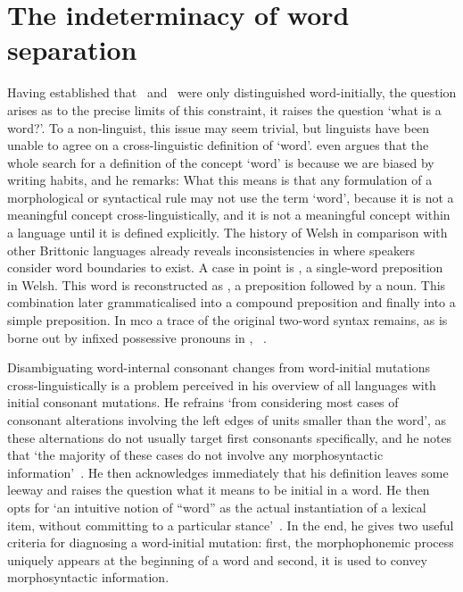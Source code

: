 \section{The indeterminacy of word separation}
\label{sec:indet-word-separ}
Having established that \lT\ and \xD\ were only distinguished word-initially, the question arises as to the precise limits of this constraint, \ie it raises the question `what is a word?'.
To a non-linguist, this issue may seem trivial, but linguists have been unable to agree on a cross-linguistic definition of `word'.
\Textcite[28]{haspelmath_indeterminacy_2011} even argues that the whole search for a definition of the concept `word' is because we are biased by writing habits, and he remarks: 
What this means is that any formulation of a morphological or syntactical rule may not use the term `word', because it is not a meaningful concept cross-linguistically, and it is not a meaningful concept within a language until it is defined explicitly. 
The history of Welsh in comparison with other Brittonic languages already reveals inconsistencies in where speakers consider word boundaries  to exist.
A case in point is , a single-word preposition in Welsh.
This word is reconstructed as  \autocite[258]{schrijver_studies_1995}, a preposition followed by a noun.
This combination later grammaticalised into a compound preposition and finally into a simple preposition.
In \gls{mco} a trace of the original two-word syntax remains, as is borne out by infixed possessive pronouns in , \etc~\autocite[120]{koch_neo-brittonic_1989}.

Disambiguating word-internal consonant changes from word-initial mutations cross-linguistically is  a problem \textcite{iosad_right_2010} perceived in his overview of all languages with initial consonant mutations.
He refrains `from considering most cases of consonant alterations involving the left edges of units smaller than the word', as these alternations do not usually target first consonants specifically, and he notes that `the majority of these cases do not involve any morphosyntactic information'~\autocite[108]{iosad_right_2010}.
He then acknowledges immediately that his definition leaves some leeway and raises the question what it means to be initial in a word.
He then opts for `an intuitive notion of ``word'' as the actual instantiation of a lexical item, without committing to a particular stance'~\autocite[109]{iosad_right_2010}.
In the end, he gives two useful criteria for diagnosing a word-initial mutation: first, the morphophonemic process uniquely appears at the beginning of a word and second, it is used to convey morphosyntactic information.


